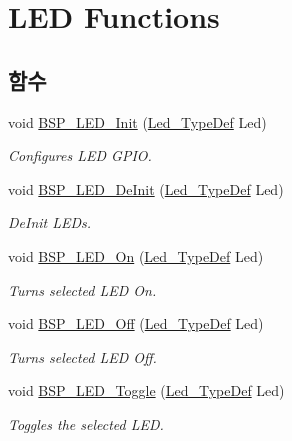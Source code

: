 \hypertarget{group___lory_s_d_k___l_e_d___functions}{}\section{L\+ED Functions}
\label{group___lory_s_d_k___l_e_d___functions}
\subsection*{함수}
\begin{DoxyCompactItemize}
\item 
void \mbox{\hyperlink{group___lory_s_d_k___l_e_d___functions_gab58a4f16a476a53653c5c400e3bed158}{B\+S\+P\+\_\+\+L\+E\+D\+\_\+\+Init}} (\mbox{\hyperlink{_lory_s_d_k__hw__conf_8h_aa059704b7ca945eb9c1e7f2c3d03fecd}{Led\+\_\+\+Type\+Def}} Led)
\begin{DoxyCompactList}\small\item\em Configures L\+ED G\+P\+IO. \end{DoxyCompactList}\item 
void \mbox{\hyperlink{group___lory_s_d_k___l_e_d___functions_ga8cb1d5b32557d492b8bf0f7109bd6d3f}{B\+S\+P\+\_\+\+L\+E\+D\+\_\+\+De\+Init}} (\mbox{\hyperlink{_lory_s_d_k__hw__conf_8h_aa059704b7ca945eb9c1e7f2c3d03fecd}{Led\+\_\+\+Type\+Def}} Led)
\begin{DoxyCompactList}\small\item\em De\+Init L\+E\+Ds. \end{DoxyCompactList}\item 
void \mbox{\hyperlink{group___lory_s_d_k___l_e_d___functions_gaee9c16b16384834c69efabf58f423d6f}{B\+S\+P\+\_\+\+L\+E\+D\+\_\+\+On}} (\mbox{\hyperlink{_lory_s_d_k__hw__conf_8h_aa059704b7ca945eb9c1e7f2c3d03fecd}{Led\+\_\+\+Type\+Def}} Led)
\begin{DoxyCompactList}\small\item\em Turns selected L\+ED On. \end{DoxyCompactList}\item 
void \mbox{\hyperlink{group___lory_s_d_k___l_e_d___functions_gaef268680154ca15c45066d64d41f9467}{B\+S\+P\+\_\+\+L\+E\+D\+\_\+\+Off}} (\mbox{\hyperlink{_lory_s_d_k__hw__conf_8h_aa059704b7ca945eb9c1e7f2c3d03fecd}{Led\+\_\+\+Type\+Def}} Led)
\begin{DoxyCompactList}\small\item\em Turns selected L\+ED Off. \end{DoxyCompactList}\item 
void \mbox{\hyperlink{group___lory_s_d_k___l_e_d___functions_ga1b9eabba7d498f41d6f16587ec0f9732}{B\+S\+P\+\_\+\+L\+E\+D\+\_\+\+Toggle}} (\mbox{\hyperlink{_lory_s_d_k__hw__conf_8h_aa059704b7ca945eb9c1e7f2c3d03fecd}{Led\+\_\+\+Type\+Def}} Led)
\begin{DoxyCompactList}\small\item\em Toggles the selected L\+ED. \end{DoxyCompactList}\end{DoxyCompactItemize}


